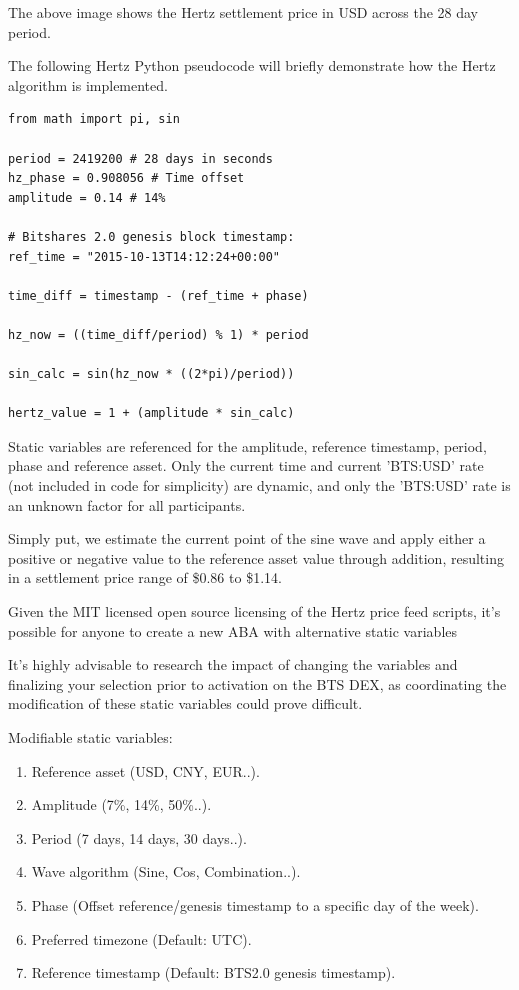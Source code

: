 \documentclass[sigconf]{acmart}
\begin{document}
\bigskip

\noindent The above image shows the Hertz settlement price in USD across the 28 day period.

\bigskip

\noindent The following Hertz Python pseudocode will briefly demonstrate how the Hertz algorithm is implemented.


\begin{lstlisting}[frame=single]
from math import pi, sin

period = 2419200 # 28 days in seconds
hz_phase = 0.908056 # Time offset
amplitude = 0.14 # 14%

# Bitshares 2.0 genesis block timestamp:
ref_time = "2015-10-13T14:12:24+00:00" 

time_diff = timestamp - (ref_time + phase)

hz_now = ((time_diff/period) % 1) * period

sin_calc = sin(hz_now * ((2*pi)/period))

hertz_value = 1 + (amplitude * sin_calc)
\end{lstlisting}

\bigskip

Static variables are referenced for the amplitude, reference timestamp, period, phase and reference asset. Only the current time and current 'BTS:USD' rate (not included in code for simplicity) are dynamic, and only the 'BTS:USD' rate is an unknown factor for all participants.

Simply put, we estimate the current point of the sine wave and apply either a positive or negative value to the reference asset value through addition, resulting in a settlement price range of \$0.86 to \$1.14.

Given the MIT licensed open source licensing of the Hertz price feed scripts, it's possible for anyone to create a new ABA with alternative static variables

It's highly advisable to research the impact of changing the variables and finalizing your selection prior to activation on the BTS DEX, as coordinating the modification of these static variables could prove difficult.

\bigskip

\noindent Modifiable static variables:
\begin{enumerate}[wide, labelwidth=!, labelindent=0pt]
\item Reference asset (USD, CNY, EUR..).
\item Amplitude (7\%, 14\%, 50\%..).
\item Period (7 days, 14 days, 30 days..).
\item Wave algorithm (Sine, Cos, Combination..).
\item Phase (Offset reference/genesis timestamp to a specific day of the week).
\item Preferred timezone (Default: UTC).
\item Reference timestamp (Default: BTS2.0 genesis timestamp).
\end{enumerate}
\end{document}
